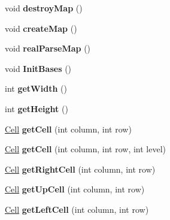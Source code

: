 \begin{DoxyCompactItemize}
\item 
\mbox{\label{class_map_abf83a6575dc797977192f7bab27b9a5d}} 
void {\bfseries destroy\+Map} ()
\item 
\mbox{\label{class_map_aaddb46d1932014b653b1fe1ec0a3fd4d}} 
void {\bfseries create\+Map} ()
\item 
\mbox{\label{class_map_a010dd2576494c50e3bc37e97c82f91ba}} 
void {\bfseries real\+Parse\+Map} ()
\item 
\mbox{\label{class_map_a5bf459b8b7043066e7717d83c187e6fa}} 
void {\bfseries Init\+Bases} ()
\item 
\mbox{\label{class_map_a8924c6c893aa1cc120da5948eb736817}} 
int {\bfseries get\+Width} ()
\item 
\mbox{\label{class_map_a38f66656c86827015aad86e6a5483f01}} 
int {\bfseries get\+Height} ()
\item 
\mbox{\label{class_map_af1fdf6d721e635e147d8e55593179f26}} 
\mbox{\hyperlink{class_cell}{Cell}} {\bfseries get\+Cell} (int column, int row)
\item 
\mbox{\label{class_map_a8c78b7bcd346291a8e561d9b8f90875b}} 
\mbox{\hyperlink{class_cell}{Cell}} {\bfseries get\+Cell} (int column, int row, int level)
\item 
\mbox{\label{class_map_a0de06a573d52151826c92ac10d3abce0}} 
\mbox{\hyperlink{class_cell}{Cell}} {\bfseries get\+Right\+Cell} (int column, int row)
\item 
\mbox{\label{class_map_ac11881b57534a9b8c2cb7ab9c3557525}} 
\mbox{\hyperlink{class_cell}{Cell}} {\bfseries get\+Up\+Cell} (int column, int row)
\item 
\mbox{\label{class_map_aca8834332e03f3210d46db287733eca4}} 
\mbox{\hyperlink{class_cell}{Cell}} {\bfseries get\+Left\+Cell} (int column, int row)
\item 
\mbox{\label{class_map_a3a93893fcec19da11f0ce6aad183120b}} 

\end{DoxyCompactItemize}
